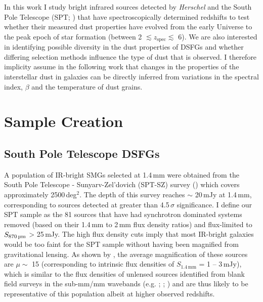 In this work I study bright infrared sources detected by \textit{Herschel} and the South Pole Telescope (SPT; \citealt{Carlstrom_2011}) that have spectroscopically determined redshifts to test whether their measured dust properties have evolved from the early Universe to the peak epoch of star formation (between 2 $\lesssim z_{\textrm{spec}} \lesssim$ 6). We are also interested in identifying possible diversity in the dust properties of DSFGs and whether differing selection methods influence the type of dust that is observed. I therefore implicity assume in the following work that changes in the properties of the interstellar dust in galaxies can be directly inferred from variations in the spectral index, $\beta$ and the temperature of dust grains.

\section{Sample Creation}
\subsection{South Pole Telescope DSFGs}

A population of IR-bright SMGs selected at 1.4\,mm were obtained from the South Pole Telescope - Sunyarv-Zel'dovich (SPT-SZ) survey (\citealt{Everett_2020}) which covers approximately 2500\,deg$^2$. The depth of this survey reaches $\sim$ 20\,mJy at 1.4\,mm, corresponding to sources detected at greater than 4.5\,$\sigma$ significance. I define our SPT sample as the 81 sources that have had synchrotron dominated systems removed (based on their 1.4\,mm to 2\,mm flux density ratios) and flux-limited to $S_{\textrm{870\,\micron}}$ > 25\,mJy. The high flux density cuts imply that most IR-bright galaxies would be too faint for the SPT sample without having been magnified from gravitational lensing. As shown by \citealt{Weiss_2013}, the average magnification of these sources are $\mu \sim$ 15 (corresponding to intrinsic flux densities of $S_{1.4\,\textrm{mm}}$ = 1 -- 3\,mJy), which is similar to the flux densities of unlensed sources identified from blank field surveys in the sub-mm/mm wavebands (e.g. \citealt{Coppin_2006}; \citealt{Pope_2006}; \citealt{Weiss_2009}) and are thus likely to be representative of this population albeit at higher observed redshifts.

